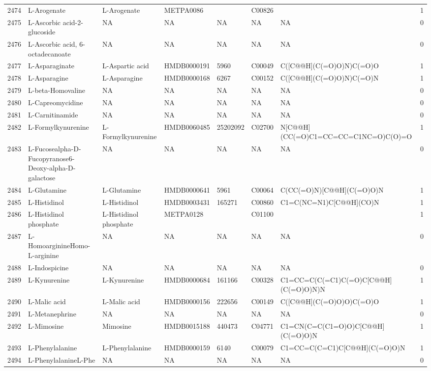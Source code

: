 \documentclass[a4paper]{article}
\begin{document}
\begin{longtable}{rlllllll}
  2474 & L-Arogenate & L-Arogenate & METPA0086 &  & C00826 &  & 1 \\ 
  2475 & L-Ascorbic acid-2-glucoside & NA & NA & NA & NA & NA & 0 \\ 
  2476 & L-Ascorbic acid, 6-octadecanoate & NA & NA & NA & NA & NA & 0 \\ 
  2477 & L-Asparaginate & L-Aspartic acid & HMDB0000191 & 5960 & C00049 & C([C@@H](C(=O)O)N)C(=O)O & 1 \\ 
  2478 & L-Asparagine & L-Asparagine & HMDB0000168 & 6267 & C00152 & C([C@@H](C(=O)O)N)C(=O)N & 1 \\ 
  2479 & L-beta-Homovaline & NA & NA & NA & NA & NA & 0 \\ 
  2480 & L-Capreomycidine & NA & NA & NA & NA & NA & 0 \\ 
  2481 & L-Carnitinamide & NA & NA & NA & NA & NA & 0 \\ 
  2482 & L-Formylkynurenine & L-Formylkynurenine & HMDB0060485 & 25202092 & C02700 & N[C@@H](CC(=O)C1=CC=CC=C1NC=O)C(O)=O & 1 \\ 
  2483 & L-Fucosealpha-D-Fucopyranose6-Deoxy-alpha-D-galactose & NA & NA & NA & NA & NA & 0 \\ 
  2484 & L-Glutamine & L-Glutamine & HMDB0000641 & 5961 & C00064 & C(CC(=O)N)[C@@H](C(=O)O)N & 1 \\ 
  2485 & L-Histidinol & L-Histidinol & HMDB0003431 & 165271 & C00860 & C1=C(NC=N1)C[C@@H](CO)N & 1 \\ 
  2486 & L-Histidinol phosphate & L-Histidinol phosphate & METPA0128 &  & C01100 &  & 1 \\ 
  2487 & L-HomoarginineHomo-L-arginine & NA & NA & NA & NA & NA & 0 \\ 
  2488 & L-Indospicine & NA & NA & NA & NA & NA & 0 \\ 
  2489 & L-Kynurenine & L-Kynurenine & HMDB0000684 & 161166 & C00328 & C1=CC=C(C(=C1)C(=O)C[C@@H](C(=O)O)N)N & 1 \\ 
  2490 & L-Malic acid & L-Malic acid & HMDB0000156 & 222656 & C00149 & C([C@@H](C(=O)O)O)C(=O)O & 1 \\ 
  2491 & L-Metanephrine & NA & NA & NA & NA & NA & 0 \\ 
  2492 & L-Mimosine & Mimosine & HMDB0015188 & 440473 & C04771 & C1=CN(C=C(C1=O)O)C[C@@H](C(=O)O)N & 1 \\ 
  2493 & L-Phenylalanine & L-Phenylalanine & HMDB0000159 & 6140 & C00079 & C1=CC=C(C=C1)C[C@@H](C(=O)O)N & 1 \\ 
  2494 & L-PhenylalanineL-Phe & NA & NA & NA & NA & NA & 0 \\ 

\end{longtable}
\end{document}
